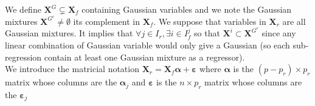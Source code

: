 \documentclass[11pt,a4paper]{article}
\begin{document}
	
We define $\boldsymbol{X}^G \subsetneq \boldsymbol{X}_f$ containing Gaussian variables and we note the Gaussian mixtures $\boldsymbol{X}^{G^c}\neq \emptyset$ its complement in $\boldsymbol{X}_f$.
We suppose that variables in $\boldsymbol{X}_r$ are all Gaussian mixtures. It implies that $\forall j  \in I_r,\exists i \in I_f^j $ so that $\boldsymbol{X}^i \subset \boldsymbol{X}^{G^c} $ since any linear combination of Gaussian variable would only give a Gaussian (so each sub-regression contain at least one Gaussian mixture as a regressor).
\\
	We introduce the matricial notation
		$\boldsymbol{X}_r=\boldsymbol{X}_f\boldsymbol{\alpha} + \boldsymbol{\varepsilon}$ where
		 $\boldsymbol{\alpha}$ is the $(p-p_r)\times p_r$ matrix whose columns are the $\boldsymbol{\alpha}_j$ and $\boldsymbol{\varepsilon}$ is the $n\times p_r$ matrix whose columns are the $\boldsymbol{\varepsilon}_j$
		
\end{document}
